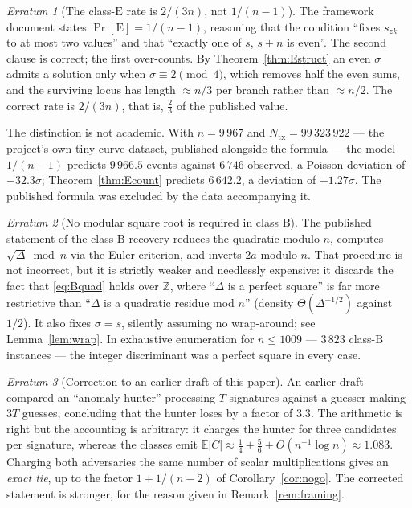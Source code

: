 \documentclass[11pt,a4paper]{article}
\theoremstyle{plain}
\theoremstyle{definition}
\theoremstyle{remark}
\newtheorem{erratum}{Erratum}
\newcommand{\Zz}{\mathbb{Z}}
\newcommand{\Ex}{\mathbb{E}}
\newcommand{\Pro}{\Pr}
\newcommand{\szk}{s_{zk}}
\newcommand{\clB}{\mathrm{B}}
\newcommand{\clE}{\mathrm{E}}
\begin{document}
\begin{erratum}[The class-$\clE$ rate is $2/(3n)$, not $1/(n-1)$]\label{err:E}
The framework document states $\Pro[\clE] = 1/(n-1)$, reasoning that the condition ``fixes $\szk$
to at most two values'' and that ``exactly one of $s$, $s+n$ is even''. The second clause is
correct; the first over-counts. By Theorem~\ref{thm:Estruct} an even $\sigma$ admits a solution
only when $\sigma \equiv 2 \pmod 4$, which removes half the even sums, and the surviving locus has
length $\approx n/3$ per branch rather than $\approx n/2$. The correct rate is $2/(3n)$, that is,
$\tfrac23$ of the published value.

The distinction is not academic. With $n = 9\,967$ and $N_{\mathrm{tx}} = 99\,323\,922$ --- the
project's own tiny-curve dataset, published alongside the formula --- the model $1/(n-1)$ predicts
$9\,966.5$ events against $6\,746$ observed, a Poisson deviation of $-32.3\sigma$;
Theorem~\ref{thm:Ecount} predicts $6\,642.2$, a deviation of $+1.27\sigma$. The published formula
was excluded by the data accompanying it.
\end{erratum}

\begin{erratum}[No modular square root is required in class $\clB$]\label{err:B}
The published statement of the class-$\clB$ recovery reduces the quadratic modulo $n$, computes
$\sqrt{\Delta} \bmod n$ via the Euler criterion, and inverts $2a$ modulo $n$. That procedure is
not incorrect, but it is strictly weaker and needlessly expensive: it discards the fact that
\eqref{eq:Bquad} holds over $\Zz$, where ``$\Delta$ is a perfect square'' is far more restrictive
than ``$\Delta$ is a quadratic residue mod $n$'' (density $\Theta(\Delta^{-1/2})$ against $1/2$).
It also fixes $\sigma = s$, silently assuming no wrap-around; see Lemma~\ref{lem:wrap}. In
exhaustive enumeration for $n \le 1009$ --- $3\,823$ class-$\clB$ instances --- the integer
discriminant was a perfect square in every case.
\end{erratum}

\begin{erratum}[Correction to an earlier draft of this paper]\label{err:self}
An earlier draft compared an ``anomaly hunter'' processing $T$ signatures against a guesser making
$3T$ guesses, concluding that the hunter loses by a factor of $3.3$. The arithmetic is right but
the accounting is arbitrary: it charges the hunter for three candidates per signature, whereas the
classes emit $\Ex|C| \approx \tfrac14 + \tfrac56 + O(n^{-1}\log n) \approx 1.083$. Charging both
adversaries the same number of scalar multiplications gives an \emph{exact tie}, up to the factor
$1 + 1/(n-2)$ of Corollary~\ref{cor:nogo}. The corrected statement is stronger, for the reason
given in Remark~\ref{rem:framing}.
\end{erratum}
\end{document}
